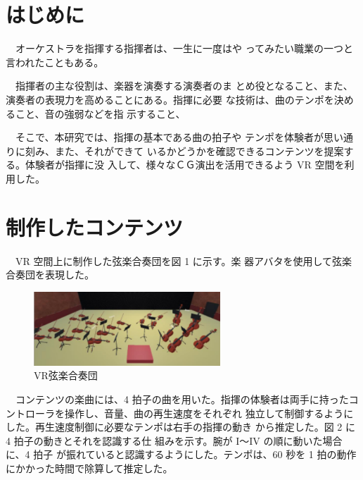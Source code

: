 \documentclass[uplatex]{jsarticle}   %
\begin{document}

\vspace{3mm}




\section{はじめに}
　オーケストラを指揮する指揮者は、一生に一度はや ってみたい職業の一つと言われたこともある。

　指揮者の主な役割は、楽器を演奏する演奏者のま とめ役となること、また、演奏者の表現力を高めることにある。指揮に必要 な技術は、曲のテンポを決めること、音の強弱などを指 示すること、

　そこで、本研究では、指揮の基本である曲の拍子や テンポを体験者が思い通りに刻み、また、それができて いるかどうかを確認できるコンテンツを提案する。体験者が指揮に没 入して、様々なＣＧ演出を活用できるよう VR 空間を利 用した。

\section{制作したコンテンツ}
　VR 空間上に制作した弦楽合奏団を図 1 に示す。楽 器アバタを使用して弦楽合奏団を表現した。

 \begin{figure}[H]
 \centering
 \includegraphics[clip,width=7cm]{gaikan.png}
 \caption{VR弦楽合奏団}\label{fig:hoge}
\end{figure}
　コンテンツの楽曲には、4 拍子の曲を用いた。指揮の体験者は両手に持ったコントローラを操作し、音量、曲の再生速度をそれぞれ 独立して制御するようにした。再生速度制御に必要なテンポは右手の指揮の動き から推定した。図 2 に 4 拍子の動きとそれを認識する仕 組みを示す。腕が I～IV の順に動いた場合に、4 拍子 が振れていると認識するようにした。テンポは、60 秒を 1 拍の動作にかかった時間で除算して推定した。
\end{document}

